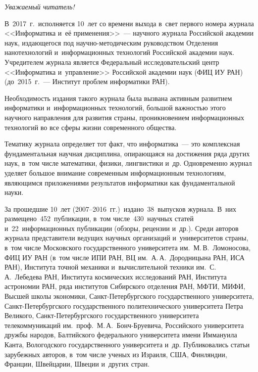 { %
{ %

\vspace*{-48pt}
\begin{center}\LARGE
\textit{Уважаемый читатель!}
\end{center}


\vspace*{4mm}

\thispagestyle{empty}

{\small

 
В~2017~г.\ исполняется 10~лет со времени выхода в~свет первого 
номера журнала <<Информатика и~её применения>>~--- 
научного журнала Российской академии наук, издающегося под 
на\-уч\-но-ме\-то\-ди\-че\-ским руководством Отделения нанотехнологий 
и~информационных технологий Российской академии наук. Учредителем журнала 
является Федеральный исследовательский центр <<Информатика и~управ\-ле\-ние>> 
Российской академии наук (ФИЦ ИУ РАН) (до~2015~г.~--- 
Институт проб\-лем информатики РАН).

Необходимость издания такого журнала была вызвана активным развитием 
информатики и~информационных технологий, большой важностью этого научного 
направления для развития страны, проникновением информационных технологий 
во все сферы жизни современного общества.

Тематику журнала определяет тот факт, что информатика~--- это комплексная 
фундаментальная научная дисциплина, опирающаяся на достижения 
ряда других наук, в~том числе математики, физики, лингвистики и~др. 
Одновременно журнал уделяет большое внимание современным информационным технологиям, 
являющимся приложениями результатов информатики как фундаментальной науки.

За прошедшие 10~лет (2007--2016~гг.)\ издано~38~выпусков журнала. В~них 
размещено~452~публикации, в~том числе~430~научных статей и~22~информационных 
публикации (обзоры, рецензии и~др.). Среди авторов журнала представители ведущих 
научных организаций и~университетов страны, в~том числе Московского государственного 
университета им.\ М.\,В.~Ломоносова, ФИЦ ИУ РАН (в~том числе ИПИ РАН, ВЦ 
им.\ А.\,А.~Дородницына РАН, ИСА РАН), Института точной механики и~вычислительной 
техники им.\ С.\,А.~Лебедева РАН, Института космических исследований РАН, 
Института астрономии РАН, ряда институтов Сибирского отделения РАН, МФТИ, МИФИ, 
Высшей школы экономики, Санкт-Пе\-тер\-бург\-ско\-го государственного университета, 
Санкт-Пе\-тер\-бург\-ско\-го государственного политехнического университета 
Петра Великого, Санкт-Пе\-тер\-бург\-ско\-го государственного университета 
телекоммуникаций им.\ проф.\ М.\,А.~Бонч-Бруе\-ви\-ча, 
Российского университета дружбы народов, Балтийского федерального университета 
имени Иммануила Канта, Вологодского государственного университета и~др. 
Публиковались статьи зарубежных авторов, в~том числе ученых из Израиля, 
США, Финляндии, Франции, Швейцарии, Швеции и~других стран. 

}}}
